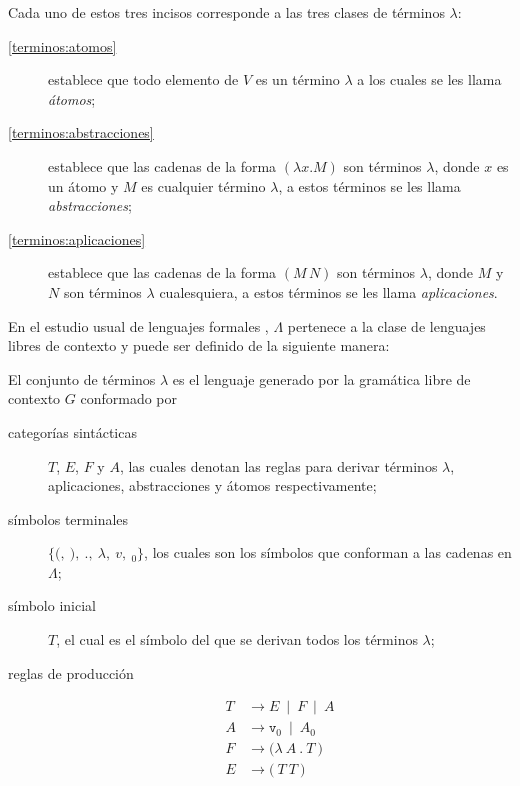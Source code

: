 Cada uno de estos tres incisos corresponde a las tres clases de términos \( λ \):

\begin{description}
\item[\eqref{terminos:atomos}] establece que todo elemento de \( V \) es un término \( λ \) a los cuales se les llama \emph{átomos};
\item[\eqref{terminos:abstracciones}] establece que las cadenas de la forma \( (λx.M) \) son términos \( λ \), donde \( x \) es un átomo y \( M \) es cualquier término \( λ \), a estos términos se les llama \emph{abstracciones};
\item[\eqref{terminos:aplicaciones}] establece que las cadenas de la forma \( (M\, N) \) son términos \( λ \), donde \( M \) y \( N \) son términos \( λ \) cualesquiera, a estos términos se les llama \emph{aplicaciones}.
\end{description}

En el estudio usual de lenguajes formales \cite{Hopcroft:Automata}, \( Λ \) pertenece a la clase de lenguajes libres de contexto y puede ser definido de la siguiente manera:

\begin{defn}[Términos \( λ \)]
  \label{defn:terminos-cfg}
  El conjunto de términos \( λ \) es el lenguaje generado por la gramática libre de contexto \( G \) conformado por

  \begin{description}
  \item[categorías sintácticas] \( T \), \( E \), \( F \) y \( A \), las cuales denotan las reglas para derivar términos \( λ \), aplicaciones, abstracciones y átomos respectivamente;
  \item[símbolos terminales] \( \{\mathtt{(},\ \mathtt{)},\ \mathtt{.},\ λ,\ v,\ {}_{0}\} \), los cuales son los símbolos que conforman a las cadenas en \( Λ \);
  \item[símbolo inicial] \( T \), el cual es el símbolo del que se derivan todos los términos \( λ \);
  \item[reglas de producción]
    \begin{subequations}
    \begin{align}
      \label{terminos-cfg:terminos} \tag{a}
      T & \rightarrow E\ \mid\ F\ \mid\ A \\
      \label{terminos-cfg:atomos} \tag{b}
      A & \rightarrow \mathtt{v}_{0}\ \mid\ A {}_{0} \\
      \label{terminos-cfg:abstracciones} \tag{c}
      F & \rightarrow \mathtt{(} λ\ A\ \mathtt{.}\ T\ \mathtt{)} \\
      \label{terminos-cfg:aplicaciones} \tag{d}
      E & \rightarrow \mathtt{(}\ T\ T\ \mathtt{)}
    \end{align}
  \end{subequations}
  \end{description}
\end{defn}

